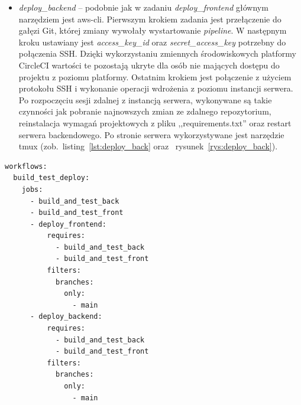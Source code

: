 \begin{itemize}
	\item \textit{deploy\_backend} -- podobnie jak w zadaniu \textit{deploy\_frontend} głównym narzędziem jest aws-cli. Pierwszym krokiem zadania jest przełączenie do gałęzi Git, której zmiany wywołały wystartowanie \textit{pipeline}. W następnym kroku ustawiany jest \textit{access\_key\_id} oraz \textit{secret\_access\_key} potrzebny do połączenia SSH. Dzięki wykorzystaniu zmiennych środowiskowych platformy CircleCI wartości te pozostają ukryte dla osób nie mających dostępu do projektu z poziomu platformy. Ostatnim krokiem jest połączenie z użyciem protokołu SSH i wykonanie operacji wdrożenia z poziomu instancji serwera. Po rozpoczęciu sesji zdalnej z instancją serwera, wykonywane są takie czynności jak pobranie najnowszych zmian ze zdalnego repozytorium, reinstalacja wymagań projektowych z pliku ,,requirements.txt'' oraz restart serwera backendowego. Po stronie serwera wykorzystywane jest narzędzie tmux (zob.~listing~\ref{lst:deploy_back} oraz ~rysunek~\ref{rys:deploy_back}).
\end{itemize}
	
\newpage
	
\begin{lstlisting}[caption=Część skryptu config.yml odpowiedzialna za określenie przepływów pracy,label={lst:workflow}]
workflows:
  build_test_deploy:
    jobs:
      - build_and_test_back
      - build_and_test_front
      - deploy_frontend:
          requires:
            - build_and_test_back
            - build_and_test_front
          filters:
            branches:
              only:
                - main
      - deploy_backend:
          requires:
            - build_and_test_back
            - build_and_test_front
          filters:
            branches:
              only:
                - main
\end{lstlisting} 


